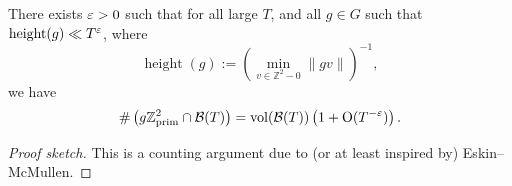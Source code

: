 \documentclass[reqno]{amsart} 
\begin{document}
\begin{lemma}
  There exists $\varepsilon > 0$ such that for all large $T$, and all $g \in G$ such that $\operatorname{height}(g) \ll T^\varepsilon$, where
  \begin{equation*}
    \operatorname{height}(g) := \left( \min_{v \in \mathbb{Z}^2 - 0} \lVert g v \rVert \right)^{-1},
  \end{equation*}
  we have
  \begin{equation*}
    \# \left( g \mathbb{Z}^2_{\mathrm{prim}} \cap \mathcal{B}(T) \right)
    = \operatorname{vol}(\mathcal{B}(T)) \left( 1 + \operatorname{O}(T^{- \varepsilon}) \right).    
  \end{equation*}
\end{lemma}
\begin{proof}[Proof sketch]
  This is a counting argument due to (or at least inspired by) Eskin--McMullen.


\end{proof}
\end{document}
